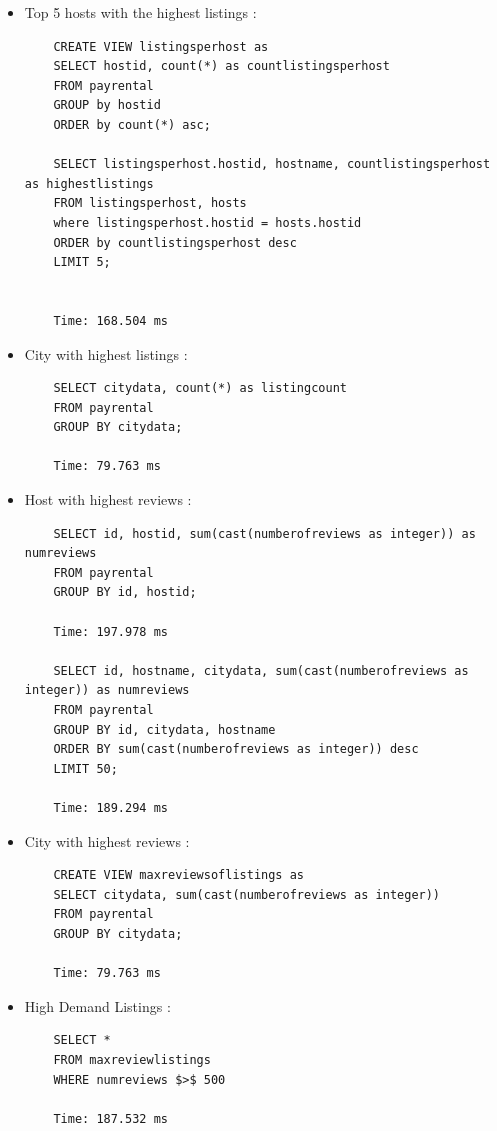 \documentclass[10pt]{article}
\begin{document}
\begin{enumerate}
\begin{itemize}
    \item Top 5 hosts with the highest listings :
    \begin{verbatim}
    CREATE VIEW listingsperhost as
    SELECT hostid, count(*) as countlistingsperhost
    FROM payrental
    GROUP by hostid
    ORDER by count(*) asc;
    
    SELECT listingsperhost.hostid, hostname, countlistingsperhost as highestlistings
    FROM listingsperhost, hosts
    where listingsperhost.hostid = hosts.hostid
    ORDER by countlistingsperhost desc
    LIMIT 5;
    
    
    Time: 168.504 ms
    \end{verbatim}

    \item City with highest listings :
    \begin{verbatim}
    SELECT citydata, count(*) as listingcount
    FROM payrental
    GROUP BY citydata;

    Time: 79.763 ms
    \end{verbatim}

    \item Host with highest reviews : 
    \begin{verbatim}
    SELECT id, hostid, sum(cast(numberofreviews as integer)) as numreviews
    FROM payrental
    GROUP BY id, hostid;
    
    Time: 197.978 ms
    
    SELECT id, hostname, citydata, sum(cast(numberofreviews as integer)) as numreviews
    FROM payrental
    GROUP BY id, citydata, hostname
    ORDER BY sum(cast(numberofreviews as integer)) desc
    LIMIT 50;
    
    Time: 189.294 ms
    \end{verbatim}
    
    \item City with highest reviews :
    \begin{verbatim}
    CREATE VIEW maxreviewsoflistings as
    SELECT citydata, sum(cast(numberofreviews as integer))
    FROM payrental
    GROUP BY citydata;

    Time: 79.763 ms
    \end{verbatim}
    
    \item High Demand Listings :
    \begin{verbatim}
    SELECT * 
    FROM maxreviewlistings
    WHERE numreviews $>$ 500

    Time: 187.532 ms
    \end{verbatim}
    

\end{itemize}
\end{enumerate}
\end{document}
